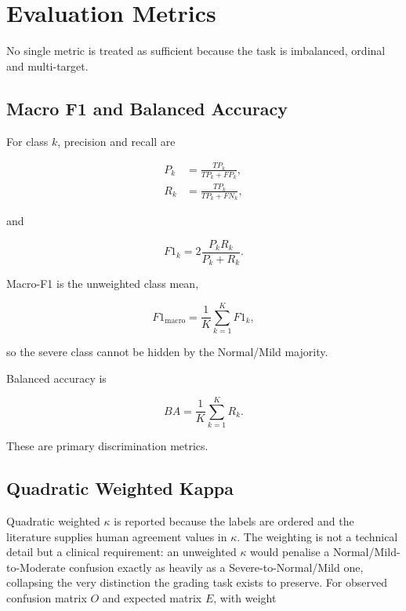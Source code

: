 \section{Evaluation Metrics}
\label{sec:method-metrics}

No single metric is treated as sufficient because the task is imbalanced,
ordinal and multi-target.

\subsection{Macro F1 and Balanced Accuracy}
\label{sec:method-macro}

For class $k$, precision and recall are

\begin{align}
P_k &= \frac{TP_k}{TP_k+FP_k},\\
R_k &= \frac{TP_k}{TP_k+FN_k},
\end{align}

and

\begin{equation}
F1_k=
2\frac{P_kR_k}{P_k+R_k}.
\end{equation}

Macro-F1 is the unweighted class mean,

\begin{equation}
F1_{\mathrm{macro}}
=
\frac{1}{K}\sum_{k=1}^{K}F1_k,
\label{eq:macro-f1}
\end{equation}

so the severe class cannot be hidden by the Normal/Mild majority.

Balanced accuracy is

\begin{equation}
BA=
\frac{1}{K}\sum_{k=1}^{K}R_k.
\label{eq:balanced-accuracy}
\end{equation}

These are primary discrimination metrics.

\subsection{Quadratic Weighted Kappa}
\label{sec:method-kappa}

Quadratic weighted $\kappa$ \cite{cohen1968weighted} is reported because the
labels are ordered and the literature supplies human agreement values in
$\kappa$. The weighting is not a technical detail but a clinical requirement:
an unweighted $\kappa$ would penalise a Normal/Mild-to-Moderate confusion
exactly as heavily as a Severe-to-Normal/Mild one, collapsing the very
distinction the grading task exists to preserve. For observed confusion matrix
$O$ and expected matrix $E$, with weight

